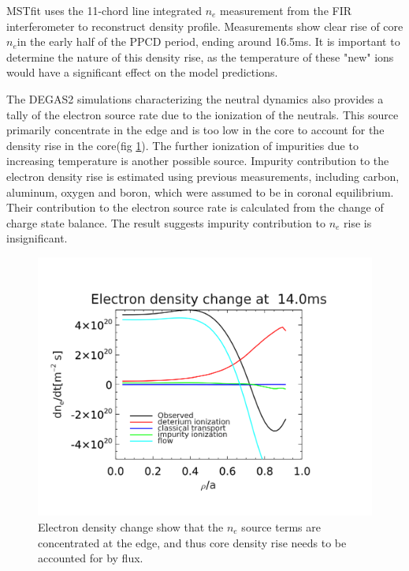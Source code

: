 \documentclass[aip, pop, preprint]{revtex4-1}
\begin{document}
MSTfit uses the 11-chord line integrated $n_e$ measurement from the FIR
interferometer to reconstruct density profile. Measurements show clear rise of
core $n_{e} $in the early half of the PPCD period, ending around 16.5ms. It is
important to determine the nature of this density rise, as the temperature of
these "new" ions would have a significant effect on the model predictions.

The DEGAS2 simulations characterizing the neutral dynamics also provides a
tally of the electron source rate due to the ionization of the neutrals. This
source primarily concentrate in the edge and is too low in the core to account
for the density rise in the core(fig \ref{fig:ne_change}). The further
ionization of impurities due to increasing temperature is another possible
source. Impurity contribution to the electron density rise is estimated using
previous measurements, including carbon, aluminum, oxygen and boron, which were
assumed to be in coronal equilibrium. Their contribution to the electron source
rate is calculated from the change of charge state balance. The result suggests
impurity contribution to $n_e$ rise is insignificant.


\begin{figure}
	\centering
	\includegraphics[width=0.95\linewidth]{./plots/dndt_at14-1}	
	\caption{Electron density change show that the $n_e$ source terms are concentrated at the edge, and thus core density rise needs to be accounted for by flux.}
	\label{fig:ne_change}
\end{figure}
\end{document}
